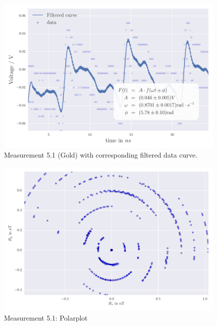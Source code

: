 \begin{figure}[H]
    \centering
    \includegraphics[width=0.7\linewidth]{analysis/figures/fit5_1}
    \caption{Measurement 5.1 (Gold) with corresponding filtered data curve.}
    \label{fig:5_1_plot}
\end{figure}
\begin{figure}[H]
    \centering
    \includegraphics[width=0.7\linewidth]{analysis/figures/polar5_1}
    \caption{Measurement 5.1: Polarplot}
    \label{fig:5_1_polar}
\end{figure}


